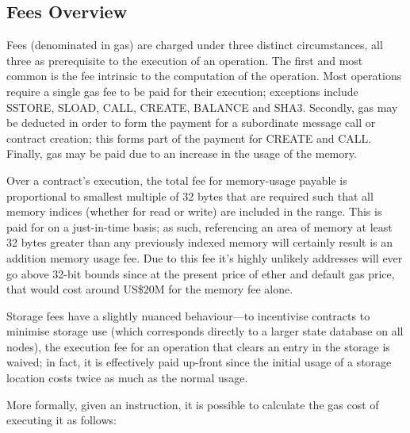 \documentclass[9pt,oneside]{amsart}
\begin{document}
\begin{multicols}{2}
\subsection{Fees Overview}

Fees (denominated in gas) are charged under three distinct circumstances, all three as prerequisite to the execution of an operation. The first and most common is the fee intrinsic to the computation of the operation. Most operations require a single gas fee to be paid for their execution; exceptions include {\small SSTORE}, {\small SLOAD}, {\small CALL}, {\small CREATE}, {\small BALANCE} and {\small SHA3}. Secondly, gas may be deducted in order to form the payment for a subordinate message call or contract creation; this forms part of the payment for {\small CREATE} and {\small CALL}. Finally, gas may be paid due to an increase in the usage of the memory.

Over a contract's execution, the total fee for memory-usage payable is proportional to smallest multiple of 32 bytes that are required such that all memory indices (whether for read or write) are included in the range. This is paid for on a just-in-time basis; as such, referencing an area of memory at least 32 bytes greater than any previously indexed memory will certainly result is an addition memory usage fee. Due to this fee it's highly unlikely addresses will ever go above 32-bit bounds since at the present price of ether and default gas price, that would cost around US\$20M for the memory fee alone.

Storage fees have a slightly nuanced behaviour---to incentivise contracts to minimise storage use (which corresponds directly to a larger state database on all nodes), the execution fee for an operation that clears an entry in the storage is waived; in fact, it is effectively paid up-front since the initial usage of a storage location costs twice as much as the normal usage.

More formally, given an instruction, it is possible to calculate the gas cost of executing it as follows:


\end{multicols}
\end{document}
